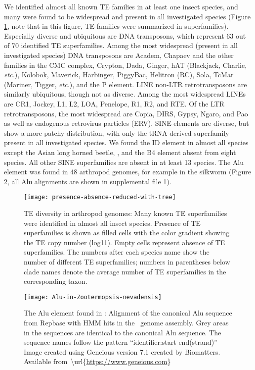 We identified almost all known TE families in at least one insect
species, and many were found to be widespread and present in all
investigated species (Figure \ref{fig:presence-absence}, note that in
this figure, TE families were summarized in superfamilies). Especially
diverse and ubiquitous are DNA transposons, which represent 63 out of 70
identified TE superfamilies.  Among the most widespread (present in all
investigated species) DNA transposons are Academ, Chapaev and the other
families in the CMC complex, Crypton, Dada, Ginger, hAT (Blackjack,
Charlie, \emph{etc.}), Kolobok, Maverick, Harbinger, PiggyBac, Helitron
(RC), Sola, TcMar (Mariner, Tigger, \emph{etc.}), and the P element.
LINE non-LTR retrotransposons are similarly ubiquitous, though not as
diverse. Among the most widespread LINEs are CR1, Jockey, L1, L2, LOA,
Penelope, R1, R2, and RTE. Of the LTR retrotransposons, the most
widespread are Copia, DIRS, Gypsy, Ngaro, and Pao as well as endogenous
retrovirus particles (ERV). SINE elements are diverse, but show a more
patchy distribution, with only the tRNA-derived superfamily present in
all investigated species. We found the ID element in almost all species
except the Asian long horned beetle, ,
and the B4 element absent from eight species. All other SINE
superfamilies are absent in at least 13 species. The Alu element was
found in 48 arthropod genomes, for example in the silkworm
 (Figure \ref{fig:alu}, all Alu alignments are
shown in supplemental file 1).

\begin{figure}[t]
\begin{center}
\texttt{[image: presence-absence-reduced-with-tree]}
\caption[TE diversity in arthropod genomes]{{TE diversity in arthropod genomes: Many known TE superfamilies were
identified in almost all insect species. Presence of TE superfamilies is
shown as filled cells with the color gradient showing the TE copy number
(log11). Empty cells represent absence of TE superfamilies. The numbers
after each species name show the number of different TE superfamilies;
numbers in parentheses below clade names denote the average number of TE
superfamilies in the corresponding taxon.%
}}
\label{fig:presence-absence}
\end{center}
\end{figure}

\begin{figure}[t]
\begin{center}
\texttt{[image: Alu-in-Zootermopsis-nevadensis]}
\caption[The Alu element found in ]{{The Alu element
found in : Alignment of the canonical Alu sequence
from Repbase with HMM hits in the~ genome assembly. Grey
areas in the sequences are identical to the canonical Alu sequence. The
sequence names follow the pattern ``identifier:start-end(strand)'' Image
created using Geneious version 7.1 created by Biomatters. Available
from~\textbackslash{}url\{\url{https://www.geneious.com}\}
{\label{fig:alu}}%
}}
\end{center}
\end{figure}

